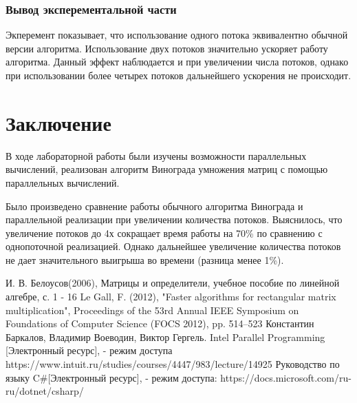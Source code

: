 \documentclass[12pt]{report}
\begin{document}
\newpage
\subsection{Вывод эксперементальной части}
Экперемент показывает, что использование одного потока эквивалентно обычной версии алгоритма. Использование двух потоков значительно ускоряет работу алгоритма. Данный эффект наблюдается и при увеличении числа потоков, однако при использовании более четырех потоков дальнейшего ускорения не происходит.
\chapter*{Заключение}
В ходе лабораторной работы были изучены возможности параллельных вычислений, реализован алгоритм Винограда умножения матриц
с помощью параллельных вычислений.

Было произведено сравнение работы обычного алгоритма Винограда и параллельной реализации при увеличении количества потоков. Выяснилось, что увеличение потоков до 4х сокращает время работы на 70\% по сравнению с
однопоточной реализацией. Однако дальнейшее увеличение количества потоков не дает значительного выигрыша во времени (разница менее 1\%). 

\begin{thebibliography}{3}
	И. В. Белоусов(2006), Матрицы и определители, учебное пособие по линейной алгебре, с. 1 - 16
	Le Gall, F. (2012), "Faster algorithms for rectangular matrix multiplication", Proceedings of the 53rd Annual IEEE Symposium on Foundations of Computer Science (FOCS 2012), pp. 514–523
	Константин Баркалов, Владимир Воеводин, Виктор Гергель. Intel Parallel Programming [Электронный ресурс], - режим доступа https://www.intuit.ru/studies/courses/4447/983/lecture/14925
	Руководство по языку C\#[Электронный ресурс], - режим доступа: https://docs.microsoft.com/ru-ru/dotnet/csharp/
\end{thebibliography}
\end{document}

